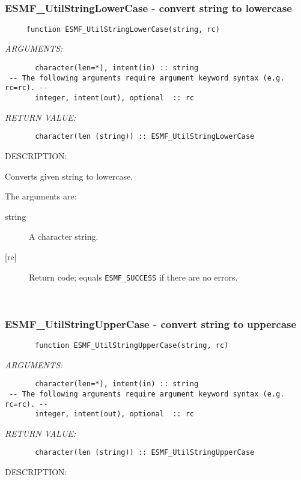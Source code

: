    
 
\mbox{}\hrulefill\ 
 
\subsubsection [ESMF\_UtilStringLowerCase] {ESMF\_UtilStringLowerCase - convert string to lowercase}


    
\begin{verbatim}     function ESMF_UtilStringLowerCase(string, rc) \end{verbatim}{\em ARGUMENTS:}
\begin{verbatim}       character(len=*), intent(in) :: string
 -- The following arguments require argument keyword syntax (e.g. rc=rc). --
       integer, intent(out), optional  :: rc  \end{verbatim}{\em RETURN VALUE:}
\begin{verbatim}       character(len (string)) :: ESMF_UtilStringLowerCase
 \end{verbatim}
{\sf DESCRIPTION:\\ }


     Converts given string to lowercase.
  
       The arguments are:
       \begin{description}
       \item[string]
         A character string.
       \item[{[rc]}]
         Return code; equals {\tt ESMF\_SUCCESS} if there are no errors.
       \end{description}
  
   
 
\mbox{}\hrulefill\ 
 
\subsubsection [ESMF\_UtilStringUpperCase] {ESMF\_UtilStringUpperCase - convert string to uppercase}


    
\begin{verbatim}       function ESMF_UtilStringUpperCase(string, rc) \end{verbatim}{\em ARGUMENTS:}
\begin{verbatim}       character(len=*), intent(in) :: string
 -- The following arguments require argument keyword syntax (e.g. rc=rc). --
       integer, intent(out), optional  :: rc  \end{verbatim}{\em RETURN VALUE:}
\begin{verbatim}       character(len (string)) :: ESMF_UtilStringUpperCase
 \end{verbatim}
{\sf DESCRIPTION:\\ }


